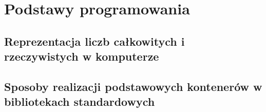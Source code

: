 \chapter{Podstawy programowania}

\section{Reprezentacja liczb całkowitych i rzeczywistych w komputerze}


\section{Sposoby realizacji podstawowych kontenerów w bibliotekach standardowych}
